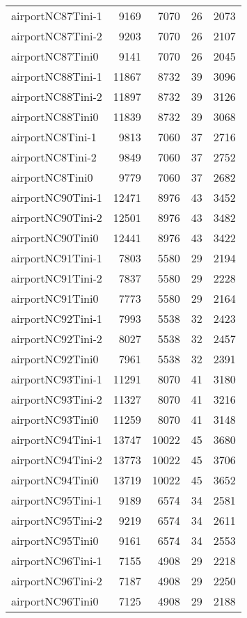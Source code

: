 \begin{tabular}{lrrrr}
airportNC87Tini-1 & 9169 & 7070 & 26 & 2073 \\
airportNC87Tini-2 & 9203 & 7070 & 26 & 2107 \\
airportNC87Tini0 & 9141 & 7070 & 26 & 2045 \\
airportNC88Tini-1 & 11867 & 8732 & 39 & 3096 \\
airportNC88Tini-2 & 11897 & 8732 & 39 & 3126 \\
airportNC88Tini0 & 11839 & 8732 & 39 & 3068 \\
airportNC8Tini-1 & 9813 & 7060 & 37 & 2716 \\
airportNC8Tini-2 & 9849 & 7060 & 37 & 2752 \\
airportNC8Tini0 & 9779 & 7060 & 37 & 2682 \\
airportNC90Tini-1 & 12471 & 8976 & 43 & 3452 \\
airportNC90Tini-2 & 12501 & 8976 & 43 & 3482 \\
airportNC90Tini0 & 12441 & 8976 & 43 & 3422 \\
airportNC91Tini-1 & 7803 & 5580 & 29 & 2194 \\
airportNC91Tini-2 & 7837 & 5580 & 29 & 2228 \\
airportNC91Tini0 & 7773 & 5580 & 29 & 2164 \\
airportNC92Tini-1 & 7993 & 5538 & 32 & 2423 \\
airportNC92Tini-2 & 8027 & 5538 & 32 & 2457 \\
airportNC92Tini0 & 7961 & 5538 & 32 & 2391 \\
airportNC93Tini-1 & 11291 & 8070 & 41 & 3180 \\
airportNC93Tini-2 & 11327 & 8070 & 41 & 3216 \\
airportNC93Tini0 & 11259 & 8070 & 41 & 3148 \\
airportNC94Tini-1 & 13747 & 10022 & 45 & 3680 \\
airportNC94Tini-2 & 13773 & 10022 & 45 & 3706 \\
airportNC94Tini0 & 13719 & 10022 & 45 & 3652 \\
airportNC95Tini-1 & 9189 & 6574 & 34 & 2581 \\
airportNC95Tini-2 & 9219 & 6574 & 34 & 2611 \\
airportNC95Tini0 & 9161 & 6574 & 34 & 2553 \\
airportNC96Tini-1 & 7155 & 4908 & 29 & 2218 \\
airportNC96Tini-2 & 7187 & 4908 & 29 & 2250 \\
airportNC96Tini0 & 7125 & 4908 & 29 & 2188 \\

\end{tabular}
